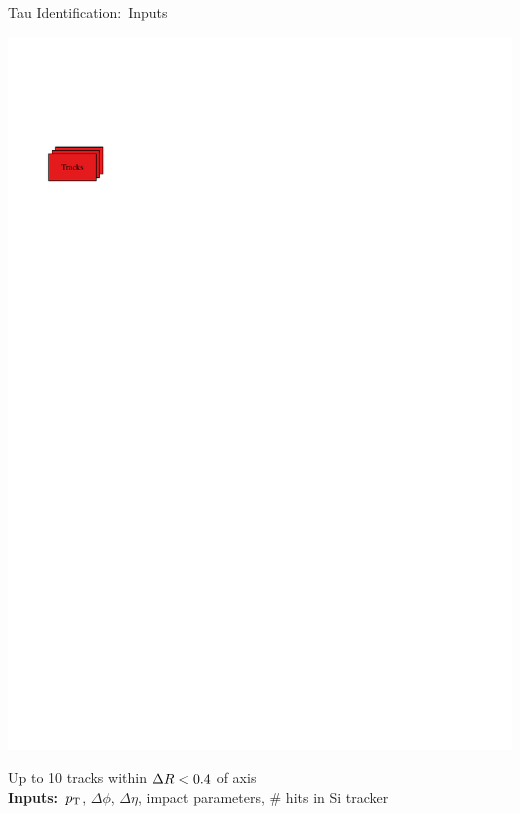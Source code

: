 \documentclass[11pt, xcolor={dvipsnames}, aspectratio=169]{beamer}
\begin{document}
\begin{frame}{Tau Identification:\ Inputs}
\begin{minipage}[c][2.2cm][c]{0.25\textwidth}
    \includegraphics[scale=1]{tauid/track_icon}
  \end{minipage}%
  \begin{minipage}[c][2.2cm][c]{0.75\textwidth}
    Up to 10 tracks within $\Delta R < 0.4$ of \tauhadvis axis\\[0.5\baselineskip]
    \textbf{Inputs:}\ $p_{\text{T}}$, $\Delta \phi$, $\Delta \eta$, impact parameters, \#
    hits in Si tracker
  \end{minipage}%


  \begin{minipage}[c][2.2cm][c]{0.25\textwidth}
    \centering


\end{minipage}
\end{frame}
\end{document}
